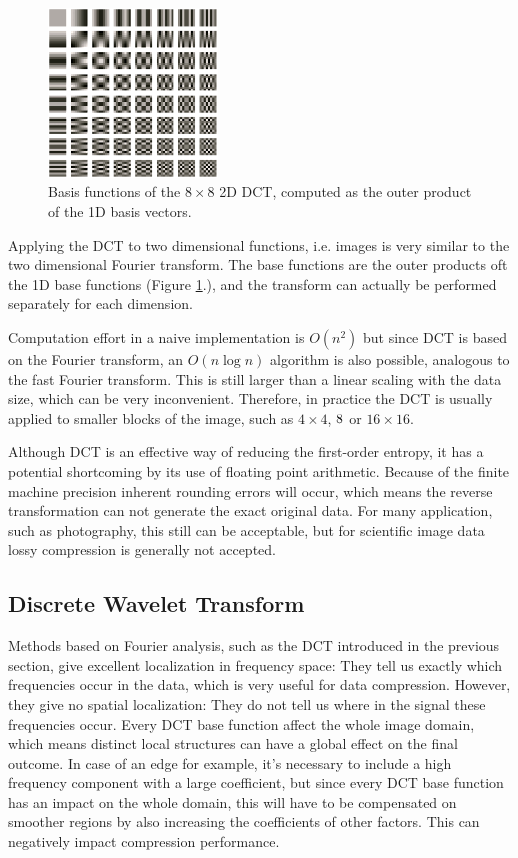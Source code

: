 \documentclass{diploma_style}
\begin{document}
\begin{figure}
\centering
\includegraphics[width=0.4\textwidth]{figures/3_compression/DCT_bases}
\caption{Basis functions of the $8 \times 8$ 2D DCT, computed as the outer product of the 1D basis vectors.}
\label{fig:DCT_bases}
\end{figure}

Applying the DCT to two dimensional functions, i.e. images is very similar to the two dimensional Fourier transform. The base functions are the outer products oft the 1D base functions (Figure \ref{fig:DCT_bases}.), and the transform can actually be performed separately for each dimension.

Computation effort in a naive implementation is $O(n^2)$ but since DCT is based on the Fourier transform, an $O(n \log n)$ algorithm is also possible, analogous to the fast Fourier transform. This is still larger than a linear scaling with the data size, which can be very inconvenient. Therefore, in practice the DCT is usually applied to smaller blocks of the image, such as $4\times4$, $8\time8$ or $16\times16$. 

Although DCT is an effective way of reducing the first-order entropy, it has a potential shortcoming by its use of floating point arithmetic. Because of the finite machine precision inherent rounding errors will occur, which means the reverse transformation can not generate the exact original data. For many application, such as photography, this still can be acceptable, but for scientific image data lossy compression is generally not accepted.


\subsection{Discrete Wavelet Transform}
Methods based on Fourier analysis, such as the DCT introduced in the previous section, give excellent localization in frequency space: They tell us exactly which frequencies occur in the data, which is very useful for data compression. However, they give no spatial localization: They do not tell us where in the signal these frequencies occur. Every DCT base function affect the whole image domain, which means distinct local structures can have a global effect on the final outcome. In case of an edge for example, it's necessary to include a high frequency component with a large coefficient, but since every DCT base function has an impact on the whole domain, this will have to be compensated on smoother regions by also increasing the coefficients of other factors. This can negatively impact compression performance.
\end{document}
